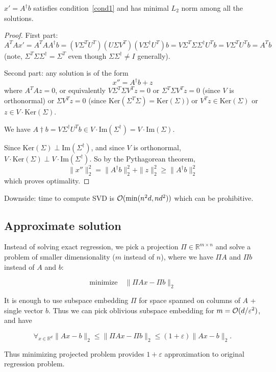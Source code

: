 \documentclass[11pt]{article}
\begin{document}
\begin{theorem}
$x' = A^\dagger b$ satisfies condition~\eqref{cond1} and has minimal $L_2$ norm among all the solutions.
\end{theorem}
\begin{proof}
First part:
$$A^TA x' = A^TA A^{\dagger} b = (V 
\Sigma^T U^T  ) (U \Sigma V^T) (V \Sigma^{\dagger} U^T) b = V \Sigma^T \Sigma \Sigma^\dagger U^T b = V \Sigma^T U^T b = A^T b$$
(note, $\Sigma^T \Sigma \Sigma^\dagger = \Sigma^T$ even though $\Sigma \Sigma^\dagger \not= I$ generally).

Second part:
any solution is of the form
$$x'' = A^\dagger b + z$$
where $A^TAz = 0$, or equivalently $V \Sigma^T \Sigma V^T z = 0$ or $\Sigma^T \Sigma V^T z = 0$ (since $V$ is orthonormal) or $\Sigma V^T z = 0$ (since $\textrm{Ker}(\Sigma^T \Sigma) = \textrm{Ker}(\Sigma)$) or $V^Tz \in \textrm{Ker}(\Sigma)$ or $z \in V \cdot \textrm{Ker}(\Sigma)$.

We have $A\dagger b = V \Sigma^\dagger U^T b \in V \cdot \textrm{Im}(\Sigma^\dagger) = V \cdot \textrm{Im}(\Sigma)$.

Since $\textrm{Ker}(\Sigma) \perp \textrm{Im}(\Sigma^\dagger)$, and since $V$ is orthonormal, $V \cdot \textrm{Ker}(\Sigma) \perp V \cdot \textrm{Im}(\Sigma^\dagger)$. So by the Pythagorean theorem,
$$\|x''\|_2^2 = \|A^{\dagger} b\|_2^2 + \|z\|_2^2 \ge  \|A^{\dagger} b\|_2^2$$
which proves optimality.
\end{proof}

Downside: time to compute SVD is $\mathcal{O}(\min(n^2d, nd^2))$ which can be prohibitive.

\subsection{Approximate solution}
Instead of solving exact regression, we pick a projection $\Pi \in \mathbb{R}^{m \times n}$ and solve a problem of smaller dimensionality ($m$ instead of $n$), where we have $\Pi A$ and $\Pi b$ instead of $A$ and $b$:

$$\textrm{minimize}\quad \|\Pi A x - \Pi b\|_2$$

It is enough to use subspace embedding $\Pi$ for space spanned on columns of $A$  + single vector $b$. Thus we can pick oblivious subspace embedding for $m = \mathcal{O}(d/\varepsilon^2)$, and have

$$\forall_{x \in \mathbb{R}^d} \|A x - b\|_2 \le \|\Pi A x - \Pi b\|_2 \le (1+\varepsilon) \| A x - b\|_2.$$

Thus minimizing projected problem provides $1+\varepsilon$ approximation to original regression problem.
\end{document}
